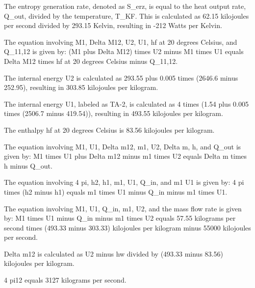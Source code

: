 The entropy generation rate, denoted as S_erz, is equal to the heat output rate, Q_out, divided by the temperature, T_KF. This is calculated as 62.15 kilojoules per second divided by 293.15 Kelvin, resulting in -212 Watts per Kelvin.

The equation involving M1, Delta M12, U2, U1, hf at 20 degrees Celsius, and Q_11,12 is given by:
(M1 plus Delta M12) times U2 minus M1 times U1 equals Delta M12 times hf at 20 degrees Celsius minus Q_11,12.

The internal energy U2 is calculated as 293.55 plus 0.005 times (2646.6 minus 252.95), resulting in 303.85 kilojoules per kilogram.

The internal energy U1, labeled as TA-2, is calculated as 4 times (1.54 plus 0.005 times (2506.7 minus 419.54)), resulting in 493.55 kilojoules per kilogram.

The enthalpy hf at 20 degrees Celsius is 83.56 kilojoules per kilogram.

The equation involving M1, U1, Delta m12, m1, U2, Delta m, h, and Q_out is given by:
M1 times U1 plus Delta m12 minus m1 times U2 equals Delta m times h minus Q_out.

The equation involving 4 pi, h2, h1, m1, U1, Q_in, and m1 U1 is given by:
4 pi times (h2 minus h1) equals m1 times U1 minus Q_in minus m1 times U1.

The equation involving M1, U1, Q_in, m1, U2, and the mass flow rate is given by:
M1 times U1 minus Q_in minus m1 times U2 equals 57.55 kilograms per second times (493.33 minus 303.33) kilojoules per kilogram minus 55000 kilojoules per second.

Delta m12 is calculated as U2 minus hw divided by (493.33 minus 83.56) kilojoules per kilogram.

4 pi12 equals 3127 kilograms per second.